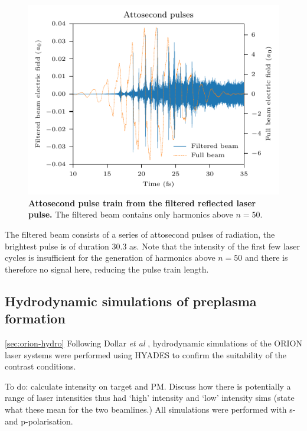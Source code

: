 \begin{figure}
	\centering
	\includegraphics{figures/orion/orion_attosecond_pulse}
	\caption[Attosecond pulse train from the filtered reflected laser pulse.]{\textbf{Attosecond pulse train from the filtered reflected laser pulse.} The filtered beam contains only harmonics above $n = 50$.}
	\label{fig:orionattosecondpulse}
\end{figure}
The filtered beam consists of a series of attosecond pulses of radiation, the brightest pulse is of duration 30.3 as. Note that the intensity of the first few laser cycles is insufficient for the generation of harmonics above $n = 50$ and there is therefore no signal here, reducing the pulse train length.


\subsection{Hydrodynamic simulations of preplasma formation}\ref{sec:orion-hydro}
Following Dollar \textit{et al} \cite{dollarScalingHighorderHarmonic2013}, hydrodynamic simulations of the ORION laser systems were performed using HYADES to confirm the suitability of the contrast conditions.

To do: calculate intensity on target and PM. Discuss how there is potentially a range of laser intensities thus had `high' intensity and `low' intensity sims (state what these mean for the two beamlines.)
All simulations were performed with s- and p-polarisation.


